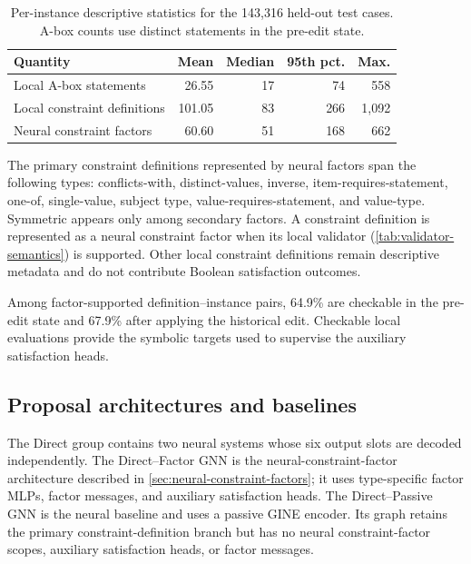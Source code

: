 \documentclass[a4paper,UKenglish,cleveref,autoref,thm-restate]{tgdk-v2021}
\begin{document}
\begin{table}[h]
\caption{Per-instance descriptive statistics for the 143,316 held-out test cases. A-box counts use distinct statements in the pre-edit state.}
\label{tab:benchmark-statistics}
\centering
\small
\begin{tabularx}{\textwidth}{@{}Xrrrr@{}}
\toprule
\textbf{Quantity} & \textbf{Mean} & \textbf{Median} & \textbf{95th pct.} & \textbf{Max.} \\
\midrule
Local A-box statements & 26.55 & 17 & 74 & 558 \\
Local constraint definitions & 101.05 & 83 & 266 & 1,092 \\
Neural constraint factors & 60.60 & 51 & 168 & 662 \\
\bottomrule
\end{tabularx}
\end{table}

\label{sec:constraint-types}
The primary constraint definitions represented by neural factors span the following types: conflicts-with, distinct-values, inverse, item-requires-statement, one-of, single-value, subject type, value-requires-statement, and value-type. Symmetric appears only among secondary factors. A constraint definition is represented as a neural constraint factor when its local validator
(\cref{tab:validator-semantics}) is supported. Other local constraint definitions
remain descriptive metadata and do not contribute Boolean satisfaction outcomes.

Among factor-supported definition--instance pairs, 64.9\% are checkable in the pre-edit state and 67.9\%
after applying the historical edit. Checkable local evaluations provide the symbolic targets used to
supervise the auxiliary satisfaction heads.

\subsection{Proposal architectures and baselines}
\label{subsec:models-baselines}
The Direct group contains two neural systems whose six output slots are decoded independently. The Direct--Factor GNN is the neural-constraint-factor architecture described in \cref{sec:neural-constraint-factors}; it uses type-specific factor MLPs, factor messages, and auxiliary satisfaction heads. The Direct--Passive GNN is the neural baseline and uses a passive GINE encoder. Its graph retains the primary constraint-definition branch but has no neural constraint-factor scopes, auxiliary satisfaction heads, or factor messages.
\end{document}

